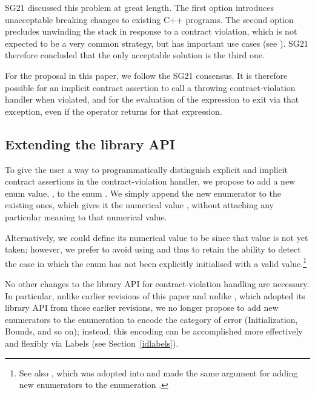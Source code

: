 SG21 discussed this problem at great length. The first option introduces unacceptable breaking changes to existing C++ programs. The second option precludes unwinding the stack in response to a contract violation, which is not expected to be a very common strategy, but has important use cases (see \cite{P3318R0}). SG21 therefore concluded that the only acceptable solution is the third one. 

For the proposal in this paper, we follow the SG21 consensus. It is therefore possible for an implicit contract assertion to call a throwing contract-violation handler when violated, and for the evaluation of the expression to exit via that exception, even if the  operator returns  for that expression.

\subsection{Extending the library API}
\label{library}

To give the user a way to programmatically distinguish explicit and implicit contract assertions in the contract-violation handler, we propose to add a new enum value, , to the enum \mbox{}. We simply append the new enumerator to the existing ones, which gives it the numerical value , without attaching any particular meaning to that numerical value.

Alternatively, we could define its numerical value to be  since that value is not yet taken; however, we prefer to avoid using  and thus to retain the ability to detect the case in which the enum has not been explicitly initialised with a valid value.\footnote{See also \cite{P3227R0}, which was adopted into \cite{P2900R14} and made the same argument for adding new enumerators to the enumeration .}

No other changes to the library API for contract-violation handling are necessary. In particular, unlike earlier revisions of this paper and unlike \cite{P3081R1}, which adopted its library API from those earlier revisions, we no longer propose to add new enumerators to the enumeration \mbox{} to encode the category of error (Initialization, Bounds, and so on); instead, this encoding can be accomplished more effectively and flexibly via Labels (see Section~\ref{idlabels}).

